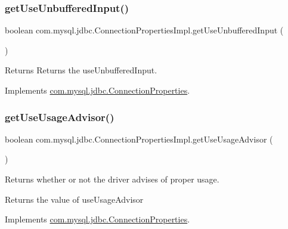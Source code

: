 \subsubsection{\texorpdfstring{get\+Use\+Unbuffered\+Input()}{getUseUnbufferedInput()}}
{\footnotesize\ttfamily boolean com.\+mysql.\+jdbc.\+Connection\+Properties\+Impl.\+get\+Use\+Unbuffered\+Input (\begin{DoxyParamCaption}{ }\end{DoxyParamCaption})}

\begin{DoxyReturn}{Returns}
Returns the use\+Unbuffered\+Input. 
\end{DoxyReturn}


Implements \mbox{\hyperlink{interfacecom_1_1mysql_1_1jdbc_1_1_connection_properties_a7776bd98c8537739178d1c9a42bd9e8c}{com.\+mysql.\+jdbc.\+Connection\+Properties}}.

\mbox{\label{classcom_1_1mysql_1_1jdbc_1_1_connection_properties_impl_a9b3b207c5c07bd5443fb9788dc800539}} 
\subsubsection{\texorpdfstring{get\+Use\+Usage\+Advisor()}{getUseUsageAdvisor()}}
{\footnotesize\ttfamily boolean com.\+mysql.\+jdbc.\+Connection\+Properties\+Impl.\+get\+Use\+Usage\+Advisor (\begin{DoxyParamCaption}{ }\end{DoxyParamCaption})}

Returns whether or not the driver advises of proper usage.

\begin{DoxyReturn}{Returns}
the value of use\+Usage\+Advisor 
\end{DoxyReturn}


Implements \mbox{\hyperlink{interfacecom_1_1mysql_1_1jdbc_1_1_connection_properties_ac3d940436d5babe33067c3f75817e9a9}{com.\+mysql.\+jdbc.\+Connection\+Properties}}.


